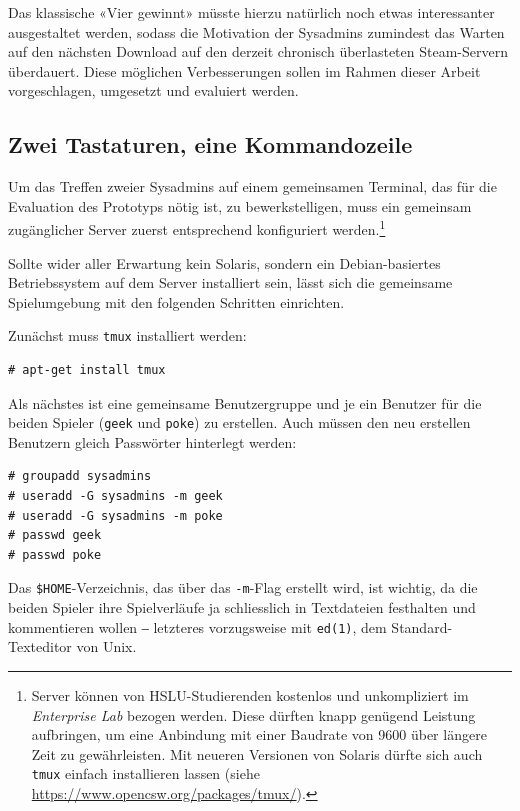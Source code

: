 \documentclass[a4paper,11pt,hidelinks]{scrartcl}
\begin{document}
Das klassische «Vier gewinnt» müsste hierzu natürlich noch etwas interessanter ausgestaltet werden, sodass die Motivation der Sysadmins zumindest das Warten auf den nächsten Download auf den derzeit chronisch überlasteten Steam-Servern überdauert. Diese möglichen Verbesserungen sollen im Rahmen dieser Arbeit vorgeschlagen, umgesetzt und evaluiert werden.

\subsection{Zwei Tastaturen, eine Kommandozeile}

Um das Treffen zweier Sysadmins auf einem gemeinsamen Terminal, das für die Evaluation des Prototyps nötig ist, zu bewerkstelligen, muss ein gemeinsam zugänglicher Server zuerst entsprechend konfiguriert werden.\footnote{Server können von HSLU-Studierenden kostenlos und unkompliziert im \textit{Enterprise Lab} bezogen werden. Diese dürften knapp genügend Leistung aufbringen, um eine Anbindung mit einer Baudrate von 9600 über längere Zeit zu gewährleisten. Mit neueren Versionen von Solaris dürfte sich auch \texttt{tmux} einfach installieren lassen (siehe \url{https://www.opencsw.org/packages/tmux/}).}

Sollte wider aller Erwartung kein Solaris, sondern ein Debian-basiertes Betriebssystem auf dem Server installiert sein, lässt sich die gemeinsame Spielumgebung mit den folgenden Schritten einrichten.

Zunächst muss \texttt{tmux} installiert werden:

\begin{lstlisting}
# apt-get install tmux
\end{lstlisting}

Als nächstes ist eine gemeinsame Benutzergruppe und je ein Benutzer für die beiden Spieler (\texttt{geek} und \texttt{poke}) zu erstellen. Auch müssen den neu erstellen Benutzern gleich Passwörter hinterlegt werden:

\begin{lstlisting}
# groupadd sysadmins
# useradd -G sysadmins -m geek
# useradd -G sysadmins -m poke
# passwd geek
# passwd poke
\end{lstlisting}

Das \texttt{\$HOME}-Verzeichnis, das über das \texttt{-m}-Flag erstellt wird, ist wichtig, da die beiden Spieler ihre Spielverläufe ja schliesslich in Textdateien festhalten und kommentieren wollen ‒ letzteres vorzugsweise mit \texttt{ed(1)}, dem Standard-Texteditor von Unix.
\end{document}
